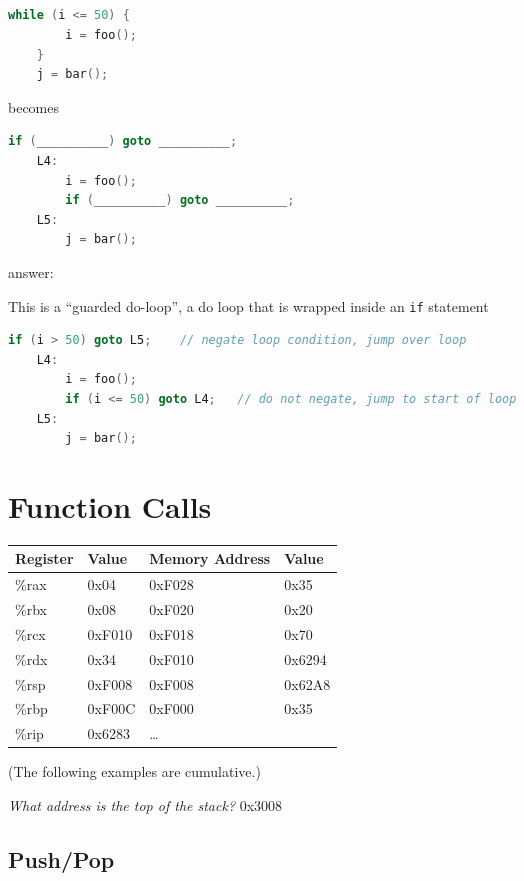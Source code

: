 \documentclass{article}
\begin{document}
\newpage
\subsection{}

\begin{lstlisting}[language=C]
    while (i <= 50) {
        i = foo();
    }
    j = bar();
\end{lstlisting}

becomes

\begin{lstlisting}[language=C]
        if (__________) goto __________;
    L4:
        i = foo();
        if (__________) goto __________;
    L5:
        j = bar();
\end{lstlisting}

answer:

This is a ``guarded do-loop'', a do loop that is wrapped inside an \lstinline{if} statement
\begin{lstlisting}[language=C]
        if (i > 50) goto L5;    // negate loop condition, jump over loop
    L4:
        i = foo();
        if (i <= 50) goto L4;   // do not negate, jump to start of loop
    L5:
        j = bar();
\end{lstlisting}

\section{Function Calls}

\begin{tabular}{|l|l||l|l|} \hline
Register & Value & Memory Address & Value \\ \hline
\%rax & 0x04   & 0xF028 & 0x35   \\ \hline
\%rbx & 0x08   & 0xF020 & 0x20   \\ \hline
\%rcx & 0xF010 & 0xF018 & 0x70   \\ \hline
\%rdx & 0x34   & 0xF010 & 0x6294 \\ \hline
\%rsp & 0xF008 & 0xF008 & 0x62A8 \\ \hline
\%rbp & 0xF00C & 0xF000 & 0x35   \\ \hline
\%rip & 0x6283 & \dots  &        \\ \hline
\end{tabular}

(The following examples are cumulative.)

\textit{What address is the top of the stack?} 0x3008

\subsection{Push/Pop}
\end{document}
